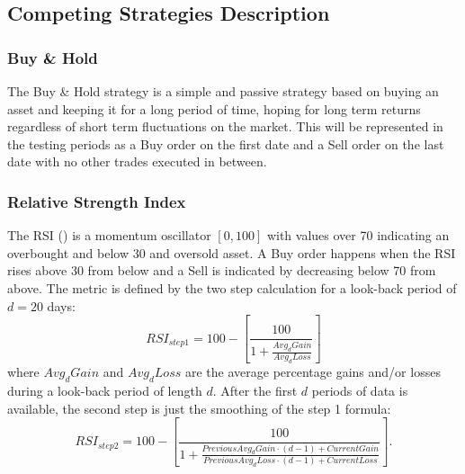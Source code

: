\documentclass[12pt, a4paper]{article}
\begin{document}
\subsection{Competing Strategies Description}
\label{app:CompetingStrats}

\subsubsection{Buy \& Hold}
The Buy \& Hold strategy is a simple and passive strategy based on buying an asset and keeping it for a long period of time, hoping for long term returns regardless of short term fluctuations on the market.
This will be represented in the testing periods as a Buy order on the first date and a Sell order on the last date with no other trades executed in between.

\subsubsection{Relative Strength Index}
The RSI (\cite{wilder1986relative}) is a momentum oscillator $[0, 100]$ with values over 70 indicating an overbought and below 30 and oversold asset. A Buy order happens when the RSI rises above 30 from below and a Sell is indicated by decreasing below 70 from above. The metric is defined by the two step calculation for a look-back period of $d=20$ days:
\begin{equation}
    \label{eq:RSI1}
    RSI_{step1} = 100 - \left[ \frac{100}{1 + \frac{Avg_d Gain}{Avg_d Loss}}\right]
\end{equation}
where $Avg_d Gain$ and $Avg_d Loss$ are the average percentage gains and/or losses during a look-back period of length $d$. After the first $d$ periods of data is available, the second step is just the smoothing of the step 1 formula:
\begin{equation}
    \label{eq:RSI2}
    RSI_{step2} = 100 - \left[ \frac{100}{1 + \frac{Previous Avg_d Gain \cdot (d-1) + Current Gain}{Previous Avg_d Loss \cdot (d-1) + Current Loss}}\right].
\end{equation}
\end{document}
